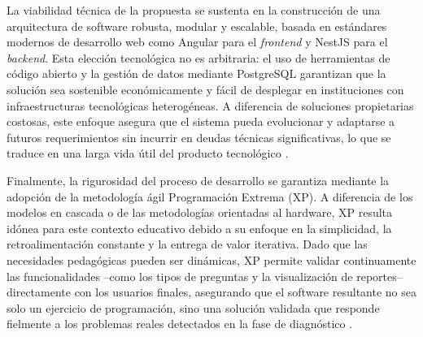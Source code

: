La viabilidad técnica de la propuesta se sustenta en la construcción de una arquitectura de software robusta, modular y escalable, basada en estándares modernos de desarrollo web como Angular para el \textit{frontend} y NestJS para el \textit{backend}. Esta elección tecnológica no es arbitraria: el uso de herramientas de código abierto y la gestión de datos mediante PostgreSQL garantizan que la solución sea sostenible económicamente y fácil de desplegar en instituciones con infraestructuras tecnológicas heterogéneas. A diferencia de soluciones propietarias costosas, este enfoque asegura que el sistema pueda evolucionar y adaptarse a futuros requerimientos sin incurrir en deudas técnicas significativas, lo que se traduce en una larga vida útil del producto tecnológico \cite{ref49_angular,ref51_postgresql}.

Finalmente, la rigurosidad del proceso de desarrollo se garantiza mediante la adopción de la metodología ágil Programación Extrema (XP). A diferencia de los modelos en cascada o de las metodologías orientadas al hardware, XP resulta idónea para este contexto educativo debido a su enfoque en la simplicidad, la retroalimentación constante y la entrega de valor iterativa. Dado que las necesidades pedagógicas pueden ser dinámicas, XP permite validar continuamente las funcionalidades --como los tipos de preguntas y la visualización de reportes-- directamente con los usuarios finales, asegurando que el software resultante no sea solo un ejercicio de programación, sino una solución validada que responde fielmente a los problemas reales detectados en la fase de diagnóstico \cite{ref53_beck}.
